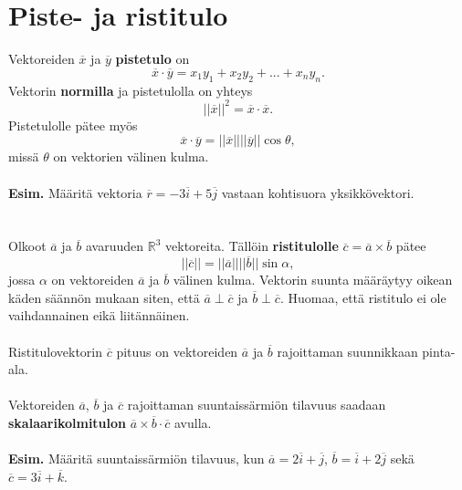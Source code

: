 \documentclass{article}
\begin{document}
\section{Piste- ja ristitulo}
Vektoreiden \(\overline{x}\) ja \(\overline{y}\) \textbf{pistetulo} on $$\overline{x}\cdot \overline{y}=x_1 y_1+x_2 y_2+ ... + x_n y_n.$$ Vektorin \textbf{normilla} ja pistetulolla on yhteys $$||\overline{x}||^2=\overline{x}\cdot \overline{x}.$$ Pistetulolle pätee myös $$\overline{x}\cdot \overline{y}=||\overline{x}||||\overline{y}||\cos \theta,$$ missä \(\theta\) on vektorien välinen kulma.\\
 \\
\textbf{Esim.} Määritä vektoria \(\overline{r}=-3\overline{i}+5\overline{j}\) vastaan kohtisuora yksikkövektori.
 \\
  \\
   \\
Olkoot \(\overline{a}\) ja \(\overline{b}\) avaruuden \(\mathbb{R}^3\) vektoreita. Tällöin \textbf{ristitulolle} \(\overline{c}=\overline{a}\times \overline{b}\) pätee $$||\overline{c}||=||\overline{a}||||\overline{b}||\sin \alpha,$$ jossa \(\alpha\) on vektoreiden \(\overline{a}\) ja \(\overline{b}\) välinen kulma. Vektorin suunta määräytyy oikean käden säännön mukaan siten, että \(\overline{a} \perp \overline{c}\) ja \(\overline{b} \perp \overline{c}\). Huomaa, että ristitulo ei ole vaihdannainen eikä liitännäinen.\\
 \\
Ristitulovektorin \(\overline{c}\) pituus on vektoreiden \(\overline{a}\) ja \(\overline{b}\) rajoittaman suunnikkaan pinta-ala.\\
 \\
Vektoreiden \(\overline{a}\), \(\overline{b}\) ja \(\overline{c}\) rajoittaman suuntaissärmiön tilavuus saadaan \textbf{skalaarikolmitulon} \(\overline{a}\times \overline{b}\cdot \overline{c}\) avulla.\\
 \\
\textbf{Esim.} Määritä suuntaissärmiön tilavuus, kun \(\overline{a}=2\overline{i}+\overline{j}\), \(\overline{b}=\overline{i}+2\overline{j}\) sekä \(\overline{c}=3\overline{i}+\overline{k}\).

\newpage
\end{document}
